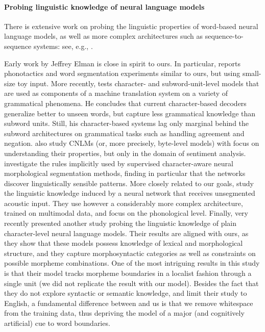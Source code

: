 \paragraph{Probing linguistic knowledge of neural language models} There is extensive work on probing the linguistic properties of
word-based neural language models, as well as more complex
architectures such as sequence-to-sequence systems: see, e.g.,
.

Early work by Jeffrey Elman is close in spirit to ours. In particular,
 reports phonotactics and word segmentation
experiments similar to ours, but using small-size toy input. More
recently,  tests character- and
subword-unit-level models that are used as components of a machine
translation system on a variety of grammatical phenomena. He concludes
that current character-based decoders generalize better to unseen
words, but capture less grammatical knowledge than subword
units. Still, his character-based systems lag only marginal behind the
subword architectures on grammatical tasks such as handling agreement
and negation.  also study CNLMs (or, more
precisely, byte-level models) with focus on understanding their
properties, but only in the domain of sentiment
analysis.  investigate the rules implicitly
used by supervised character-aware neural morphological segmentation
methods, finding in particular that the networks discover
linguistically sensible patterns. More closely related to our goals,
 study the linguistic knowledge induced by
a neural network that receives unsegmented acoustic input. They use
however a considerably more complex architecture, trained on
multimodal data, and focus on the phonological level. Finally, very
recently  presented another study
probing the linguistic knowledge of plain character-level neural
language models. Their results are aligned with ours, as they show
that these models possess knowledge of lexical and morphological
structure, and they capture morphosyntactic categories as well as
constraints on possible morpheme combinations. One of the most
intriguing results in this study is that their model tracks morpheme
boundaries in a localist fashion through a single unit (we did not
replicate the result with our model). Besides the fact that they do
not explore syntactic or semantic knowledge, and limit their study to
English, a fundamental difference between
 and us is that we remove
whitespace from the training data, thus depriving the model of a major
(and cognitively artificial) cue to word boundaries.


